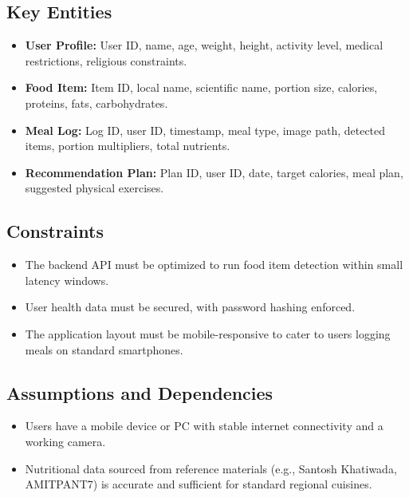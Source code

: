 \documentclass[11pt,a4paper]{article}
\begin{document}
\subsection{Key Entities}
\begin{itemize}[leftmargin=*]
  \item \textbf{User Profile:} User ID, name, age, weight, height, activity level, medical restrictions, religious constraints.
  \item \textbf{Food Item:} Item ID, local name, scientific name, portion size, calories, proteins, fats, carbohydrates.
  \item \textbf{Meal Log:} Log ID, user ID, timestamp, meal type, image path, detected items, portion multipliers, total nutrients.
  \item \textbf{Recommendation Plan:} Plan ID, user ID, date, target calories, meal plan, suggested physical exercises.
\end{itemize}

\subsection{Constraints}
\begin{itemize}[leftmargin=*]
  \item The backend API must be optimized to run food item detection within small latency windows.
  \item User health data must be secured, with password hashing enforced.
  \item The application layout must be mobile-responsive to cater to users logging meals on standard smartphones.
\end{itemize}

\subsection{Assumptions and Dependencies}
\begin{itemize}[leftmargin=*]
  \item Users have a mobile device or PC with stable internet connectivity and a working camera.
  \item Nutritional data sourced from reference materials (e.g., Santosh Khatiwada, AMITPANT7) is accurate and sufficient for standard regional cuisines.
\end{itemize}

\end{document}
